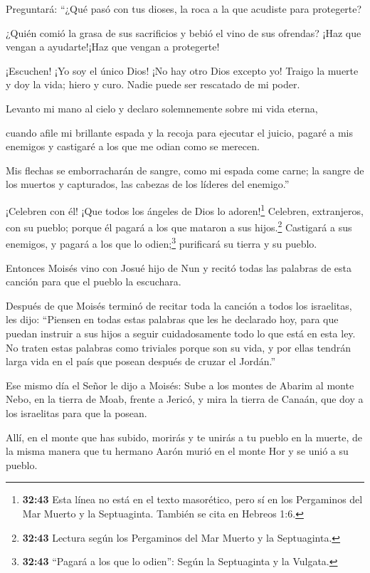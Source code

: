  Preguntará: ``¿Qué pasó con tus dioses, la roca a la que
acudiste para protegerte?

 ¿Quién comió la grasa de sus sacrificios y bebió el vino
de sus ofrendas? ¡Haz que vengan a ayudarte!¡Haz que vengan a
protegerte!

 ¡Escuchen! ¡Yo soy el único Dios! ¡No hay otro Dios
excepto yo! Traigo la muerte y doy la vida; hiero y curo. Nadie puede
ser rescatado de mi poder.

 Levanto mi mano al cielo y declaro solemnemente sobre mi
vida eterna,

 cuando afile mi brillante espada y la recoja para ejecutar
el juicio, pagaré a mis enemigos y castigaré a los que me odian como se
merecen.

 Mis flechas se emborracharán de sangre, como mi espada
come carne; la sangre de los muertos y capturados, las cabezas de los
líderes del enemigo.''

 ¡Celebren con él! ¡Que todos los ángeles de Dios lo
adoren!\footnote{\textbf{32:43} Esta línea no está en el texto
  masorético, pero sí en los Pergaminos del Mar Muerto y la Septuaginta.
  También se cita en Hebreos 1:6.} Celebren, extranjeros, con su pueblo;
porque él pagará a los que mataron a sus hijos.\footnote{\textbf{32:43}
  Lectura según los Pergaminos del Mar Muerto y la Septuaginta.}
Castigará a sus enemigos, y pagará a los que lo odien;\footnote{\textbf{32:43}
  ``Pagará a los que lo odien'': Según la Septuaginta y la Vulgata.}
purificará su tierra y su pueblo.

 Entonces Moisés vino con Josué hijo de Nun y recitó todas
las palabras de esta canción para que el pueblo la escuchara.

 Después de que Moisés terminó de recitar toda la canción a
todos los israelitas,  les dijo: ``Piensen en todas estas
palabras que les he declarado hoy, para que puedan instruir a sus hijos
a seguir cuidadosamente todo lo que está en esta ley.  No
traten estas palabras como triviales porque son su vida, y por ellas
tendrán larga vida en el país que posean después de cruzar el Jordán.''

 Ese mismo día el Señor le dijo a Moisés: 
Sube a los montes de Abarim al monte Nebo, en la tierra de Moab, frente
a Jericó, y mira la tierra de Canaán, que doy a los israelitas para que
la posean.

 Allí, en el monte que has subido, morirás y te unirás a tu
pueblo en la muerte, de la misma manera que tu hermano Aarón murió en el
monte Hor y se unió a su pueblo.

